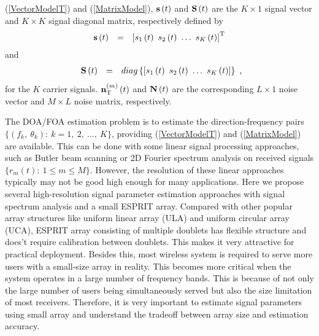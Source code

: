 \documentclass[conference]{IEEEtran}
\newcommand{\bs}{{\bf s}}
\newcommand{\bn}{{\bf n}}
\newcommand{\bN}{{\bf N}}
\newcommand{\bS}{{\bf S}}
\begin{document}
(\ref{VectorModelT}) and (\ref{MatrixModel}), $\bs\left(t\right)$
and $\bS\left(t\right)$ are the $K\times 1$ signal vector and
$K\times K$ signal diagonal matrix, respectively defined by
\begin{equation}
\begin{array}{rcl}
\bs\left(t\right)&=&\left[s_{1}\left(t\right)\
s_{2}\left(t\right)\ \ldots\ s_{K}\left(t\right)\right]^{\rm T}
\end{array}
\end{equation}
\noindent and
\begin{equation}
\begin{array}{rcl}
\bS\left(t\right)&=&\mbox{diag}\left\{\left[s_{1}\left(t\right)\
s_{2}\left(t\right)\ \ldots\ s_{K}\left(t\right)\right]\right\}
\end{array},
\end{equation}
\noindent for the $K$ carrier signals. $\bn_{\rm
T}^{(m)}\left(t\right)$ and $\bN\left(t\right)$ are the
corresponding $L\times 1$ noise vector and $M\times L$ noise
matrix, respectively.

The DOA/FOA estimation problem is to estimate the
direction-frequency pairs $\{\left(f_{k},\ \theta_{k}\right):\
k=1,\ 2,\ \ldots,\ K\}$, providing (\ref{VectorModelT}) and
(\ref{MatrixModel}) are available. This can be done with some
linear signal processing approaches, such as Butler beam scanning
or 2D Fourier spectrum analysis on received signals
$\{r_{m}\left(t\right):\ 1\leq m\leq M \}$. However, the
resolution of these linear approaches typically may not be good
high enough for many applications. Here we propose several
high-resolution signal parameter estimation approaches with signal
spectrum analysis and a small ESPRIT array. Compared with other
popular array structures like uniform linear array (ULA) and
uniform circular array (UCA), ESPRIT array consisting of multiple
doublets has flexible structure and does't require calibration
between doublets. This makes it very attractive for practical
deployment. Besides this, most wireless system is required to
serve more users with a small-size array in reality. This becomes
more critical when the system operates in a large number of
frequency bands. This is because of not only the large number of
users being simultaneously served but also the size limitation of
most receivers. Therefore, it is very important to estimate signal
parameters using small array and understand the tradeoff between
array size and estimation accuracy.
\end{document}
